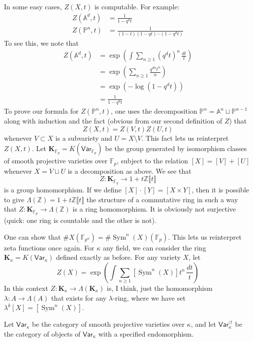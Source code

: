 \documentclass{article}
\newcommand{\dZ}{\mathbb{Z}}
\newcommand{\vark}{\mathsf{Var}_\kappa}
\newcommand{\varko}{\mathsf{Var}_\kappa^\circlearrowleft}
\begin{document}
In some easy cases, $Z(X,t)$ is computable. For example: 
\begin{align*}
  Z(\mathbb{A}^d,t) &= \frac{1}{1-q^d t} \\
  Z(\mathbb{P}^n,t) &= \frac{1}{(1-t)(1-q t)\cdots (1-q^d t)}
\end{align*}
To see this, we note that 
\begin{align*}
  Z(\mathbb{A}^d,t) &= \exp\left(\int\sum_{n\geqslant 1} (q^d t)^n \, \frac{dt}{t}\right) \\
    &= \exp\left(\sum_{n\geqslant 1} \frac{q^{d n} t^n}{n}\right) \\
    &= \exp\left(-\log(1-q^d t)\right) \\
    &= \frac{1}{1-q^d t}
\end{align*}
To prove our formula for $Z(\mathbb{P}^n,t)$, one uses the decomposition 
$\mathbb{P}^n=\mathbb{A}^n\sqcup \mathbb{P}^{n-1}$ along with induction and 
the fact (obvious from our second definition of $Z$) that 
\[
  Z(X,t) = Z(V,t) Z(U,t)
\]
whenever $V\subset X$ is a subvariety and $U=X\setminus V$. This fact lets us 
reinterpret $Z(X,t)$. Let $\mathbf K_{\mathbb F_p} = K(\mathsf{Var}_{\mathbb{F}_p})$ be the group 
generated by isomorphism classes of smooth projective varieties over 
$\mathbb{F}_p$, subject to the relation $[X]=[V]+[U]$ whenever 
$X=V\sqcup U$ is a decomposition as above. We see that 
\[
  Z:\mathbf K_{\mathbb{F}_q}\to 1+t\dZ\llbracket t\rrbracket
\]
is a group homomorphism. If we define $[X]\cdot[Y]=[X\times Y]$, then it is 
possible to give $\Lambda(\dZ)=1+t\dZ\llbracket t\rrbracket$ the structure of 
a commutative ring in such a way that 
$Z:\mathbf K_{\mathbb{F}_p}\to \Lambda(\dZ)$ is a ring homomorphism. It 
is obviously not surjective (quick: one ring is countable and the other is 
not). 

One can show that 
$\# X(\mathbb{F}_{p^n}) = \# \operatorname{Sym}^n(X)(\mathbb{F}_p)$. This lets 
us reinterpret zeta functions once again. For $\kappa$ any field, we can 
consider the ring $\mathbf K_\kappa = K(\vark)$ defined exactly as before. For 
any variety $X$, let 
\[
  Z(X) = \exp\left(\int \sum_{n\geqslant 1} [\operatorname{Sym}^n(X)] t^n\, \frac{dt}{t}\right)
\]
In this context $Z:\mathbf K_\kappa\to \Lambda(\mathbf K_\kappa)$ is, I think, just the 
homomorphism $\lambda:A\to \Lambda(A)$ that exists for any $\lambda$-ring, 
where we have set $\lambda^k [X] = [\operatorname{Sym}^n(X)]$. 

Let $\vark$ be the category of smooth projective varieties over 
$\kappa$, and let $\varko$ be the category of objects of $\vark$ with a 
specified endomorphism. 
\end{document}
